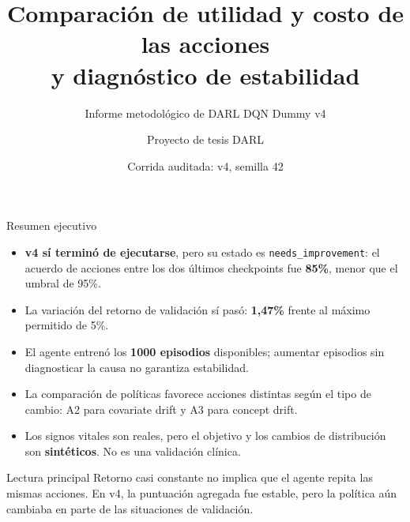 \documentclass[aspectratio=169,10pt]{beamer}
\title[DARL DQN Dummy v4]{Comparación de utilidad y costo de las acciones\\y diagnóstico de estabilidad}
\subtitle{Informe metodológico de DARL DQN Dummy v4}
\author{Proyecto de tesis DARL}
\institute{Demostración experimental con datos PhysioNet y etiqueta sintética}
\date{Corrida auditada: v4, semilla 42}
\begin{document}
\begin{frame}
  \titlepage
\end{frame}

\begin{frame}{Resumen ejecutivo}
\begin{itemize}
  \item \textbf{v4 sí terminó de ejecutarse}, pero su estado es
        \texttt{needs\_improvement}: el acuerdo de acciones entre los dos
        últimos checkpoints fue \textbf{85\%}, menor que el umbral de 95\%.
  \item La variación del retorno de validación sí pasó: \textbf{1,47\%}
        frente al máximo permitido de 5\%.
  \item El agente entrenó los \textbf{1000 episodios} disponibles; aumentar
        episodios sin diagnosticar la causa no garantiza estabilidad.
  \item La comparación de políticas favorece acciones distintas según el tipo
        de cambio: A2 para covariate drift y A3 para concept drift.
  \item Los signos vitales son reales, pero el objetivo y los cambios de
        distribución son \textbf{sintéticos}. No es una validación clínica.
\end{itemize}
\vspace{0.3em}
\begin{block}{Lectura principal}
Retorno casi constante no implica que el agente repita las mismas acciones.
En v4, la puntuación agregada fue estable, pero la política aún cambiaba en
parte de las situaciones de validación.
\end{block}
\end{frame}
\end{document}
